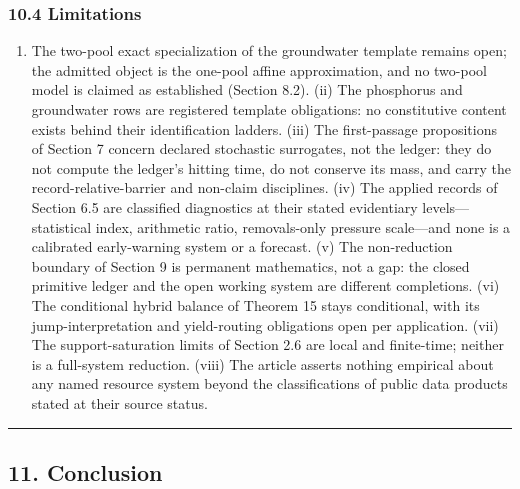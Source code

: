\documentclass[11pt]{article}
\providecommand{\tightlist}{\setlength{\itemsep}{0pt}\setlength{\parskip}{0pt}}
\begin{document}
\subsubsection{10.4 Limitations}\label{limitations}

\begin{enumerate}
\def\labelenumi{(\roman{enumi})}
\tightlist
\item
  The two-pool exact specialization of the groundwater template remains
  open; the admitted object is the one-pool affine approximation, and no
  two-pool model is claimed as established (Section 8.2). (ii) The
  phosphorus and groundwater rows are registered template obligations:
  no constitutive content exists behind their identification ladders.
  (iii) The first-passage propositions of Section 7 concern declared
  stochastic surrogates, not the ledger: they do not compute the
  ledger's hitting time, do not conserve its mass, and carry the
  record-relative-barrier and non-claim disciplines. (iv) The applied
  records of Section 6.5 are classified diagnostics at their stated
  evidentiary levels---statistical index, arithmetic ratio,
  removals-only pressure scale---and none is a calibrated
  early-warning system or a forecast. (v) The non-reduction boundary of
  Section 9 is permanent mathematics, not a gap: the closed primitive
  ledger and the open working system are different completions. (vi) The
  conditional hybrid balance of Theorem 15 stays conditional, with its
  jump-interpretation and yield-routing obligations open per
  application. (vii) The support-saturation limits of Section 2.6 are
  local and finite-time; neither is a full-system reduction. (viii) The
  article asserts nothing empirical about any named resource system
  beyond the classifications of public data products stated at their
  source status.
\end{enumerate}

\begin{center}\rule{0.5\linewidth}{0.5pt}\end{center}

\subsection{11. Conclusion}\label{conclusion}
\end{document}
